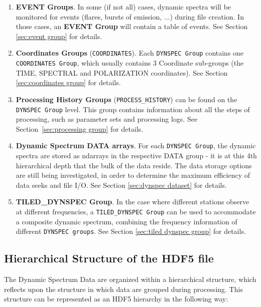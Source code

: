 \documentclass[a4paper,10pt,bibtotoc]{scrartcl}
\begin{document}
\begin{enumerate}
\item \textbf{EVENT Groups}. In some (if not all) cases, dynamic spectra will be
monitored for events (flares, bursts of emission, ...) during file creation. In
those cases, an \textbf{EVENT Group} will contain a table of events.
See Section \ref{sec:event group} for details.

\item \textbf{Coordinates Groups} (\verb|COORDINATES|). Each
  \texttt{DYNSPEC Group} contains one \texttt{COORDINATES Group},
  which usually contains 3 Coordinate sub-groups (the TIME, SPECTRAL and
  POLARIZATION coordinates). See Section \ref{sec:coordinates group} for details.

\item \textbf{Processing History Groups} (\verb|PROCESS_HISTORY|) can
  be found on the \texttt{DYNSPEC Group} level. 
  This group contains information about all the steps of
  processing, such as parameter sets and processing logs. See
  Section~\ref{sec:processing group} for details.

\item \textbf{Dynamic Spectrum DATA arrays}. 
For each \texttt{DYNSPEC Group}, the dynamic spectra are stored as ndarrays in 
the respective DATA group - it is at this 
4th hierarchical depth that the bulk of the data reside. The data storage options
are still being investigated, in order to determine the maximum efficiency of
data seeks and file I/O.  
See Section \ref{sec:dynspec dataset} for details.

\item \textbf{TILED\_DYNSPEC Group}. 
In the case where different stations observe at different frequencies,
a  \texttt{TILED\_DYNSPEC Group} can be used
to accommodate a composite dynamic spectrum, combining the frequency information of
different \texttt{DYNSPEC groups}.
See Section \ref{sec:tiled dynspec group} for details.

\end{enumerate}


\subsection{Hierarchical Structure of the HDF5 file}

The Dynamic Spectrum Data are organized within a hierarchical structure, which
reflects upon the structure in which data are grouped during processing.  This
structure can be represented as an HDF5 hierarchy in the following way:
\end{document}

